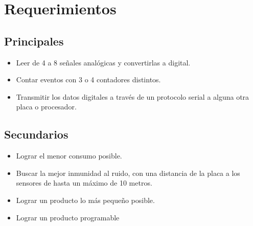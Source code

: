 \section{Requerimientos}
\subsection{Principales}
\begin{itemize}
  \item Leer de 4 a 8 se\~nales anal\'ogicas y convertirlas a digital.
  \item Contar eventos con 3 o 4 contadores distintos.
  \item Transmitir los datos digitales a trav\'es de un protocolo serial a alguna otra placa o procesador.
\end{itemize}


\subsection{Secundarios}
\begin{itemize}
  \item Lograr el menor consumo posible.
  \item Buscar la mejor inmunidad al ruido, con una distancia de la placa a los sensores de hasta un m\'aximo de 10 metros.
  \item Lograr un producto lo m\'as peque\~no posible.
  \item Lograr un producto programable
\end{itemize}